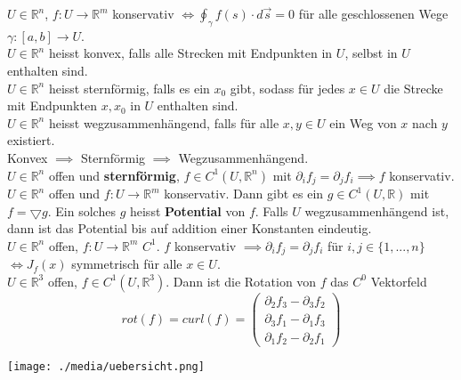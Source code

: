     $U\in\mathbb R^n$, $f:U\rightarrow\mathbb R^m$ konservativ $\iff
    \oint_\gamma f(s)\cdot d\overrightarrow{s}=0$ für alle geschlossenen Wege
    $\gamma:[a,b]\rightarrow U$.\\
    $U\in\mathbb R^n$ heisst konvex, falls alle Strecken mit Endpunkten in $U$,
    selbst in $U$ enthalten sind.\\
    $U\in\mathbb R^n$ heisst sternförmig, falls es ein $x_0$ gibt, sodass für
    jedes $x\in U$ die Strecke mit Endpunkten $x, x_0$ in $U$ enthalten sind.\\
    $U\in\mathbb R^n$ heisst wegzusammenhängend, falls für alle $x,y\in U$ ein
    Weg von $x$ nach $y$ existiert.\\
    Konvex $\implies$ Sternförmig $\implies$ Wegzusammenhängend.\\
    $U\in\mathbb R^n$ offen und \textbf{sternförmig}, $f\in C^1(U,\mathbb R^n)$ mit
    $\partial_if_j=\partial_jf_i\implies f$ konservativ.\\
    $U\in\mathbb R^n$ offen und $f:U\rightarrow\mathbb R^m$ konservativ. Dann
    gibt es ein $g\in C^1(U,\mathbb R)$ mit $f= \bigtriangledown g$. Ein solches
    $g$ heisst \textbf{Potential} von $f$. Falls $U$ wegzusammenhängend ist, dann ist das
    Potential bis auf addition einer Konstanten eindeutig.\\
    $U\in\mathbb R^n$ offen, $f:U\rightarrow\mathbb R^m$ $C^1$. $f$ konservativ
    $\implies\partial_if_j=\partial_jf_i$ für $i,j\in\{1,...,n\}$ $\iff J_f(x)$
    symmetrisch für alle $x\in U$.\\
    $U\in\mathbb R^3$ offen, $f\in C^1(U,\mathbb R^3)$. Dann ist die Rotation
    von $f$ das $C^0$ Vektorfeld 
    $$ rot(f)=curl(f)=\begin{pmatrix}
      \partial_2f_3-\partial_3f_2\\
      \partial_3f_1-\partial_1f_3\\
      \partial_1f_2-\partial_2f_1
      \end{pmatrix} $$
    \begin{minipage}{\linewidth}
      \texttt{[image: ./media/uebersicht.png]}
    \end{minipage}
